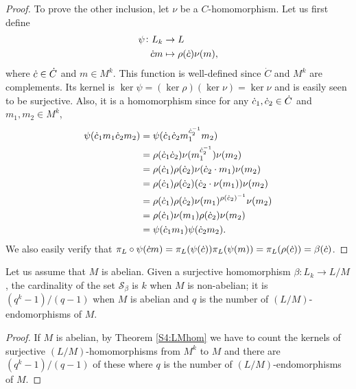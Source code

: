 \begin{proof}
    To prove the other inclusion, let $\nu$ be a $C$-homomorphism. 
    Let us first define
    \begin{align*}
        \psi \colon L_k &\rightarrow L \\
                \dot{c} m &\mapsto \rho(\dot{c})\nu(m),
    \end{align*}
    where $\dot{c} \in \dot C$ and $m \in M^k$.
    This function is well-defined since $\dot{C}$ and $M^k$ are complements. Its kernel is $\ker \psi = (\ker \rho) (\ker \nu) = \ker \nu$ and is easily seen to be surjective. Also, it is a homomorphism since for any $\dot{c}_1, \dot{c}_2 \in \dot{C}$ and $m_1, m_2 \in M^k$,
    \begin{align*}
        \psi(\dot{c}_1 m_1 \dot{c}_2 m_2) &= \psi(\dot{c}_1 \dot{c}_2 m_1^{\dot{c}_2^{-1}} m_2) \\
                                   &= \rho(\dot{c}_1 \dot{c}_2) \nu(m_1^{\dot{c}_2^{-1}}) \nu(m_2) \\
                                   &= \rho(\dot{c}_1) \rho(\dot{c}_2) \nu(\dot{c}_2 \cdot m_1) \nu(m_2) \\
                                   &= \rho(\dot{c}_1) \rho(\dot{c}_2) (\dot{c}_2 \cdot \nu(m_1)) \nu(m_2) \\
                                   &= \rho(\dot{c}_1) \rho(\dot{c}_2) \nu(m_1)^{\rho(\dot{c}_2)^{-1}} \nu(m_2) \\
                                   &= \rho(\dot{c}_1) \nu(m_1) \rho(\dot{c}_2) \nu(m_2) \\
                                   &= \psi(\dot{c}_1 m_1) \psi(\dot{c}_2 m_2).
    \end{align*}
    We also easily verify that $\pi_L \circ \psi(\dot{c} m) = \pi_L(\psi(\dot{c}))\pi_L(\psi(m))=\pi_L(\rho(\dot{c})) = \beta(\dot{c})$.
    \end{proof}

    \begin{theorem}
        \label{cardSA}
        Let us assume that $M$ is abelian. Given a surjective homomorphism $\beta \colon L_k \rightarrow L/M$, the cardinality of the set $\mathscr{S}_\beta$ is $k$ when $M$ is non-abelian; it is $(q^k-1)/(q-1)$ when $M$ is abelian and $q$ is the number of $(L/M)$-endomorphisms of $M$.
    \end{theorem}

    \begin{proof}
        If $M$ is abelian, by Theorem \ref{S4:LMhom} we have to count the kernels of surjective $(L/M)$-homomorphisms from $M^k$ to $M$ and there are $(q^k-1)/(q-1)$ of these where $q$ is the number of $(L/M)$-endomorphisms of $M$.
    \end{proof}





